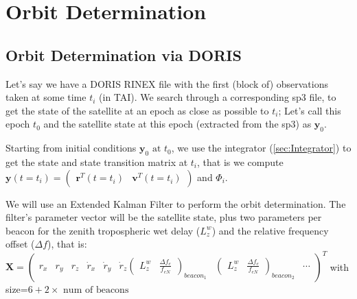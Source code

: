 \chapter{Orbit Determination}
\label{ch:orbit-determination}

\section{Orbit Determination via DORIS}
\label{sec:pod}
Let's say we have a DORIS RINEX file with the first (block of) observations 
taken at some time $t_i$ (in TAI). We search through a corresponding sp3 file, 
to get the state of the satellite at an epoch as close as possible to $t_i$; 
Let's call this epoch $t_0$ and the satellite state at this epoch (extracted 
from the sp3) as $\bm{y}_0$.

Starting from initial conditions $\bm{y}_0 \text{ at } t_0$, we use the integrator 
(\ref{sec:Integrator}) to get the state and state transition matrix at $t_i$, 
that is we compute 
$\bm{y}(t=t_i) = \begin{pmatrix} \bm{r}^T(t=t_i) & \bm{v}^T(t=t_i) \end{pmatrix}$ 
and $\Phi _i$.

We will use an Extended Kalman Filter to perform the orbit determination. The 
filter's parameter vector will be the satellite state, plus two parameters per 
beacon for the zenith tropospheric wet delay ($L^w_z$) and the relative frequency 
offset ($\Delta f$), that is:
$\bm{X}=
    \begin{pmatrix}
        r_x & r_y & r_z & \dot{r}_x & \dot{r}_y & \dot{r}_z 
        \begin{pmatrix} L^w_z & \frac{\Delta f_e}{f_{eN}} \end{pmatrix}_{beacon_1} & 
        \begin{pmatrix} L^w_z & \frac{\Delta f_e}{f_{eN}} \end{pmatrix}_{beacon_2} &
        \cdots 
    \end{pmatrix}^T$
with size=$6+2 \times \text{ num of beacons}$

